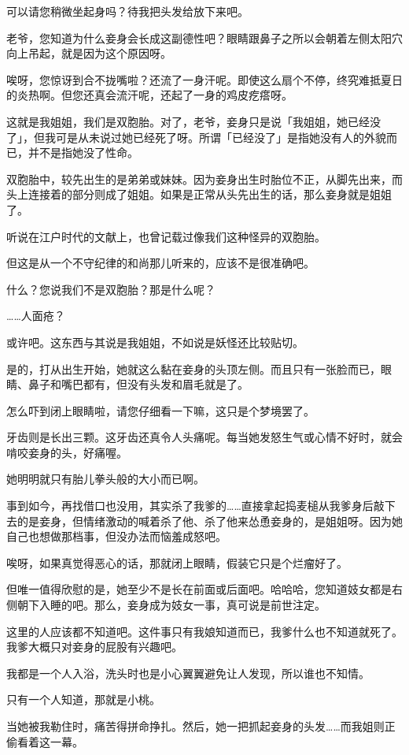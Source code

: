 \documentclass[portrait,a4paper]{article}
\begin{document}
可以请您稍微坐起身吗？待我把头发给放下来吧。

老爷，您知道为什么妾身会长成这副德性吧？眼睛跟鼻子之所以会朝着左侧太阳穴向上吊起，就是因为这个原因呀。

唉呀，您惊讶到合不拢嘴啦？还流了一身汗呢。即使这么扇个不停，终究难抵夏日的炎热啊。但您还真会流汗呢，还起了一身的鸡皮疙瘩呀。

这就是我姐姐，我们是双胞胎。对了，老爷，妾身只是说「我姐姐，她已经没了」，但我可是从未说过她已经死了呀。所谓「已经没了」是指她没有人的外貌而已，并不是指她没了性命。

双胞胎中，较先出生的是弟弟或妹妹。因为妾身出生时胎位不正，从脚先出来，而头上连接着的部分则成了姐姐。如果是正常从头先出生的话，那么妾身就是姐姐了。

听说在江户时代的文献上，也曾记载过像我们这种怪异的双胞胎。

但这是从一个不守纪律的和尚那儿听来的，应该不是很准确吧。

什么？您说我们不是双胞胎？那是什么呢？

……人面疮？

或许吧。这东西与其说是我姐姐，不如说是妖怪还比较贴切。

是的，打从出生开始，她就这么黏在妾身的头顶左侧。而且只有一张脸而已，眼睛、鼻子和嘴巴都有，但没有头发和眉毛就是了。

怎么吓到闭上眼睛啦，请您仔细看一下嘛，这只是个梦境罢了。

牙齿则是长出三颗。这牙齿还真令人头痛呢。每当她发怒生气或心情不好时，就会啃咬妾身的头，好痛喔。

她明明就只有胎儿拳头般的大小而已啊。

事到如今，再找借口也没用，其实杀了我爹的……直接拿起捣麦槌从我爹身后敲下去的是妾身，但情绪激动的喊着杀了他、杀了他来怂恿妾身的，是姐姐呀。因为她自己也想做那档事，但没办法而恼羞成怒吧。

唉呀，如果真觉得恶心的话，那就闭上眼睛，假装它只是个烂瘤好了。

但唯一值得欣慰的是，她至少不是长在前面或后面吧。哈哈哈，您知道妓女都是右侧朝下入睡的吧。那么，妾身成为妓女一事，真可说是前世注定。

这里的人应该都不知道吧。这件事只有我娘知道而已，我爹什么也不知道就死了。我爹大概只对妾身的屁股有兴趣吧。

我都是一个人入浴，洗头时也是小心翼翼避免让人发现，所以谁也不知情。

只有一个人知道，那就是小桃。

当她被我勒住时，痛苦得拼命挣扎。然后，她一把抓起妾身的头发……而我姐则正偷看着这一幕。
\end{document}
